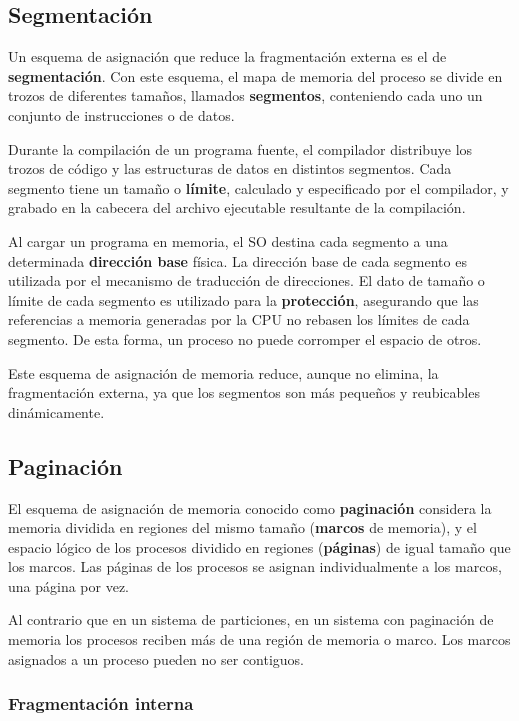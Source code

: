 \documentclass[spanish,A4,]{article}
\begin{document}
\subsection{Segmentación}\label{segmentaciuxf3n}

Un esquema de asignación que reduce la fragmentación externa es el de
\textbf{segmentación}. Con este esquema, el mapa de memoria del proceso
se divide en trozos de diferentes tamaños, llamados \textbf{segmentos},
conteniendo cada uno un conjunto de instrucciones o de datos.

Durante la compilación de un programa fuente, el compilador distribuye
los trozos de código y las estructuras de datos en distintos segmentos.
Cada segmento tiene un tamaño o \textbf{límite}, calculado y
especificado por el compilador, y grabado en la cabecera del archivo
ejecutable resultante de la compilación.

Al cargar un programa en memoria, el SO destina cada segmento a una
determinada \textbf{dirección base} física. La dirección base de cada
segmento es utilizada por el mecanismo de traducción de direcciones. El
dato de tamaño o límite de cada segmento es utilizado para la
\textbf{protección}, asegurando que las referencias a memoria generadas
por la CPU no rebasen los límites de cada segmento. De esta forma, un
proceso no puede corromper el espacio de otros.

Este esquema de asignación de memoria reduce, aunque no elimina, la
fragmentación externa, ya que los segmentos son más pequeños y
reubicables dinámicamente.

\subsection{Paginación}\label{paginaciuxf3n}

El esquema de asignación de memoria conocido como \textbf{paginación}
considera la memoria dividida en regiones del mismo tamaño
(\textbf{marcos} de memoria), y el espacio lógico de los procesos
dividido en regiones (\textbf{páginas}) de igual tamaño que los marcos.
Las páginas de los procesos se asignan individualmente a los marcos, una
página por vez.

Al contrario que en un sistema de particiones, en un sistema con
paginación de memoria los procesos reciben más de una región de memoria
o marco. Los marcos asignados a un proceso pueden no ser contiguos.

\subsubsection{Fragmentación interna}\label{fragmentaciuxf3n-interna}
\end{document}
